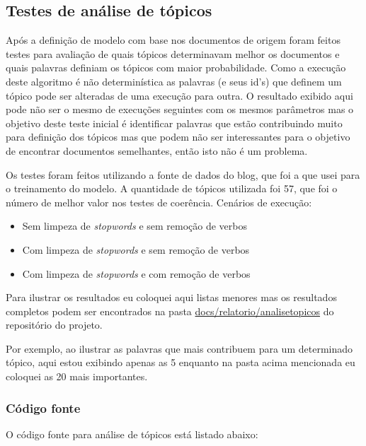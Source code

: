\subsection{Testes de análise de tópicos}

Após a definição de modelo com base nos documentos de origem foram feitos testes para avaliação de quais tópicos determinavam melhor os documentos e quais 
palavras definiam os tópicos com maior probabilidade. Como a execução deste algoritmo é não determinística as palavras (e seus id's) que definem 
um tópico pode ser alteradas de uma execução para outra. O resultado exibido aqui pode não ser o mesmo de execuções seguintes com os mesmos parâmetros mas 
o objetivo deste teste inicial é identificar palavras que estão contribuindo muito para definição dos tópicos mas que podem não ser interessantes 
para o objetivo de encontrar documentos semelhantes, então isto não é um problema.

Os testes foram feitos utilizando a fonte de dados do blog, que foi a que usei para o treinamento do modelo. A quantidade de tópicos utilizada foi 
57, que foi o número de melhor valor nos testes de coerência.
Cenários de execução:

\begin{itemize}
    \item Sem limpeza de \textit{stopwords} e sem remoção de verbos
    \item Com limpeza de \textit{stopwords} e sem remoção de verbos
    \item Com limpeza de \textit{stopwords} e com remoção de verbos
\end{itemize}

Para ilustrar os resultados eu coloquei aqui listas menores mas os resultados completos podem ser encontrados na pasta 
\href{https://github.com/heldergr/tcc-pucmg-2/tree/main/src/python/docs/relatorio/analisetopicos}{docs/relatorio/analisetopicos} do repositório do projeto.

Por exemplo, ao ilustrar as palavras que mais contribuem para um determinado tópico, aqui estou exibindo apenas as 5 enquanto na pasta acima mencionada eu 
coloquei as 20 mais importantes.

\subsubsection{Código fonte}

O código fonte para análise de tópicos está listado abaixo:



